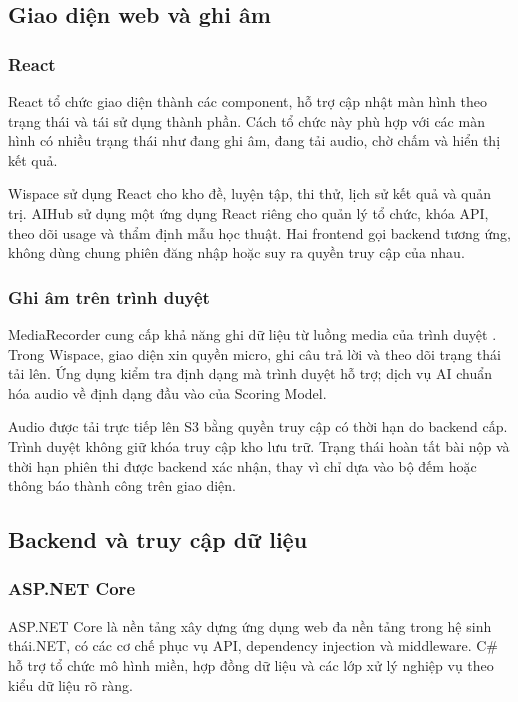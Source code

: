 \subsection{Giao diện web và ghi âm}
\subsubsection{React}

React tổ chức giao diện thành các component, hỗ trợ cập nhật màn hình theo trạng thái và tái sử dụng thành phần. Cách tổ chức này phù hợp với các màn hình có nhiều trạng thái như đang ghi âm, đang tải audio, chờ chấm và hiển thị kết quả.

Wispace sử dụng React cho kho đề, luyện tập, thi thử, lịch sử kết quả và quản trị. AIHub sử dụng một ứng dụng React riêng cho quản lý tổ chức, khóa API, theo dõi usage và thẩm định mẫu học thuật. Hai frontend gọi backend tương ứng, không dùng chung phiên đăng nhập hoặc suy ra quyền truy cập của nhau.

\subsubsection{Ghi âm trên trình duyệt}

MediaRecorder cung cấp khả năng ghi dữ liệu từ luồng media của trình duyệt \parencite{ch4_mediarecorder}. Trong Wispace, giao diện xin quyền micro, ghi câu trả lời và theo dõi trạng thái tải lên. Ứng dụng kiểm tra định dạng mà trình duyệt hỗ trợ; dịch vụ AI chuẩn hóa audio về định dạng đầu vào của Scoring Model.

Audio được tải trực tiếp lên S3 bằng quyền truy cập có thời hạn do backend cấp. Trình duyệt không giữ khóa truy cập kho lưu trữ. Trạng thái hoàn tất bài nộp và thời hạn phiên thi được backend xác nhận, thay vì chỉ dựa vào bộ đếm hoặc thông báo thành công trên giao diện.

\subsection{Backend và truy cập dữ liệu}
\subsubsection{ASP.NET Core}

ASP.NET Core là nền tảng xây dựng ứng dụng web đa nền tảng trong hệ sinh thái.NET, có các cơ chế phục vụ API, dependency injection và middleware. C\# hỗ trợ tổ chức mô hình miền, hợp đồng dữ liệu và các lớp xử lý nghiệp vụ theo kiểu dữ liệu rõ ràng.

